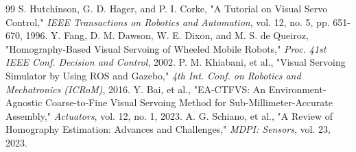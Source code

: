 \documentclass{article}
\begin{document}
\begin{thebibliography}{99}
 S. Hutchinson, G. D. Hager, and P. I. Corke, "A Tutorial on Visual Servo Control," \textit{IEEE Transactions on Robotics and Automation}, vol. 12, no. 5, pp. 651-670, 1996.
 Y. Fang, D. M. Dawson, W. E. Dixon, and M. S. de Queiroz, "Homography-Based Visual Servoing of Wheeled Mobile Robots," \textit{Proc. 41st IEEE Conf. Decision and Control}, 2002.
 P. M. Khiabani, et al., "Visual Servoing Simulator by Using ROS and Gazebo," \textit{4th Int. Conf. on Robotics and Mechatronics (ICRoM)}, 2016.
 Y. Bai, et al., "EA-CTFVS: An Environment-Agnostic Coarse-to-Fine Visual Servoing Method for Sub-Millimeter-Accurate Assembly," \textit{Actuators}, vol. 12, no. 1, 2023.
 A. G. Schiano, et al., "A Review of Homography Estimation: Advances and Challenges," \textit{MDPI: Sensors}, vol. 23, 2023.
\end{thebibliography}
\end{document}
